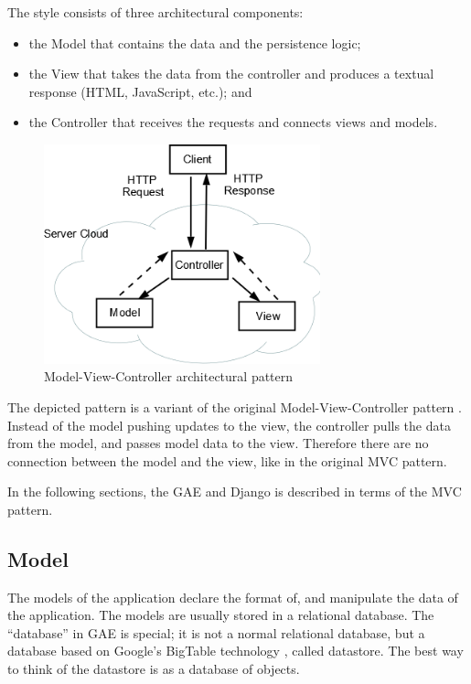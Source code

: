 The style consists of three architectural components:
\begin{itemize} 
  \item the Model that contains the data and the persistence logic;
  \item the View that takes the data from the controller and produces
a textual response (HTML, JavaScript, etc.); and
  \item the Controller that receives the requests and connects views
and models.
\end{itemize}

\begin{figure}[htbp]
  \centering
  \includegraphics[width=8cm]{./Figures/mvc}
  \caption{Model-View-Controller architectural pattern }
  \label{fig:mvc}
\end{figure}

The depicted pattern is a variant of the original Model-View-Controller pattern
\citep{RefWorks:28}. Instead of the model pushing updates to the view, the
controller pulls the data from the model, and passes model data to the
view. Therefore there are no connection between the model and the view, like in
the original MVC pattern.

In the following sections, the GAE and Django is described in terms of the MVC
pattern.

\subsection{Model}\label{sec:gae_model}
The models of the application declare the format of, and manipulate the data of
the application. The models are usually stored in a relational database. The
``database'' in GAE is special; it is not a normal relational database,
but a database based on Google's BigTable technology \citep{RefWorks:26}, called
datastore. The best way to think of the datastore is as a database of objects.

